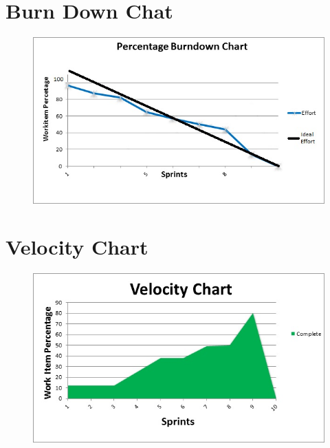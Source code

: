 \documentclass[a4paper]{article}
\begin{document}
\vfill
\clearpage
\section{Burn Down Chat}

\begin{center}
\begin{figure}[H]
\includegraphics[width=1\linewidth]{./pictures/BurndownChart.jpg}
\end{figure}
\end{center}

\vfill
\section{Velocity Chart}

\begin{center}
\begin{figure}[H]
\includegraphics[width=1\linewidth]{./pictures/VelocityChart.jpg}
\end{figure}
\end{center}
\end{document}
